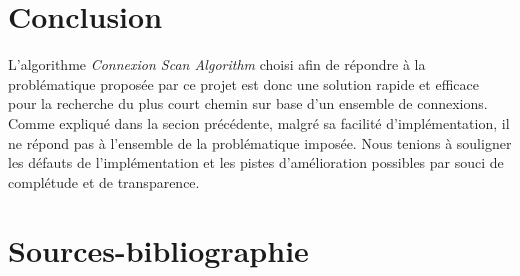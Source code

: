 \documentclass[12pt]{article}
\begin{document}
\section{Conclusion}
L'algorithme \emph{Connexion Scan Algorithm} choisi afin de répondre à la problématique proposée par ce projet est donc une solution rapide et efficace pour la recherche du plus court chemin
sur base d'un ensemble de connexions. Comme expliqué dans la secion précédente, malgré sa facilité d'implémentation, il ne répond pas à l'ensemble de la problématique imposée. Nous
tenions à souligner les défauts de l'implémentation et les pistes d'amélioration possibles par souci de complétude et de transparence.


\section{Sources-bibliographie}
\printbibliography
\end{document}
